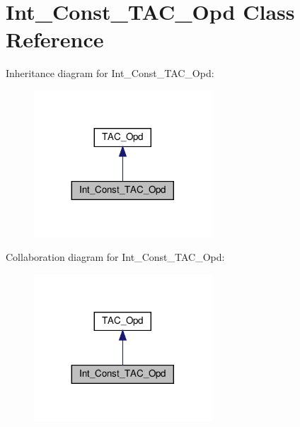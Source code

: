 \hypertarget{classInt__Const__TAC__Opd}{}\section{Int\+\_\+\+Const\+\_\+\+T\+A\+C\+\_\+\+Opd Class Reference}
\label{classInt__Const__TAC__Opd}


Inheritance diagram for Int\+\_\+\+Const\+\_\+\+T\+A\+C\+\_\+\+Opd\+:
\nopagebreak
\begin{figure}[H]
\begin{center}
\leavevmode
\includegraphics[width=188pt]{classInt__Const__TAC__Opd__inherit__graph}
\end{center}
\end{figure}


Collaboration diagram for Int\+\_\+\+Const\+\_\+\+T\+A\+C\+\_\+\+Opd\+:
\nopagebreak
\begin{figure}[H]
\begin{center}
\leavevmode
\includegraphics[width=188pt]{classInt__Const__TAC__Opd__coll__graph}
\end{center}
\end{figure}
